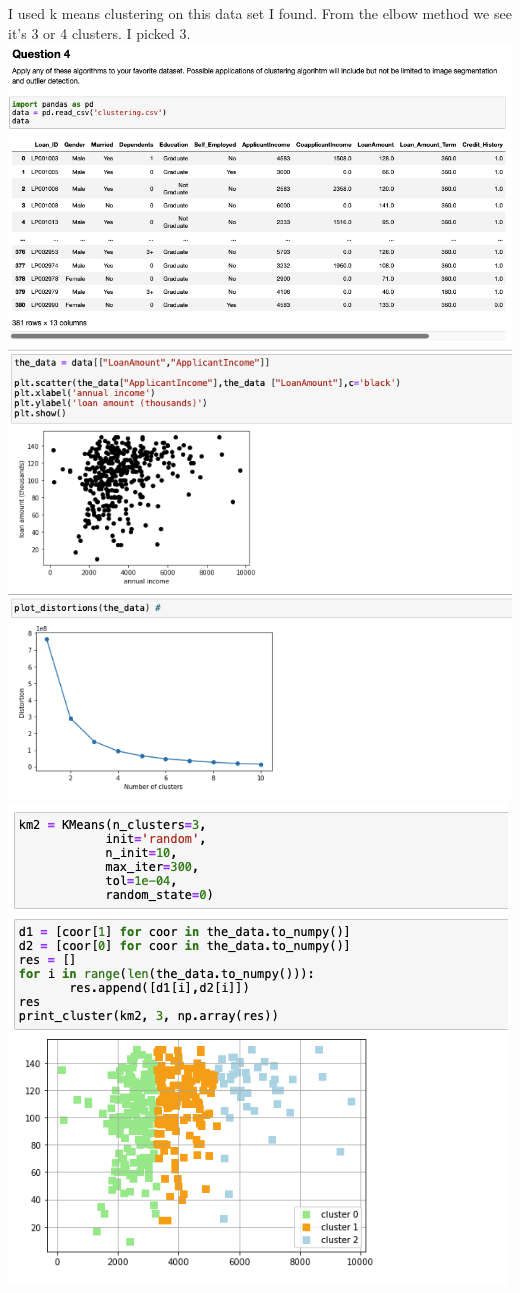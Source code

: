 \documentclass[11pt]{article}
\begin{document}
I used k means clustering on this data set I found. From the elbow method we see it's 3 or 4 clusters. I picked 3. \\
\includegraphics[scale=0.36]{img19} \\
\includegraphics[scale=0.4]{img20} \\
\includegraphics[scale=0.4]{img21} \\
\end{document}
